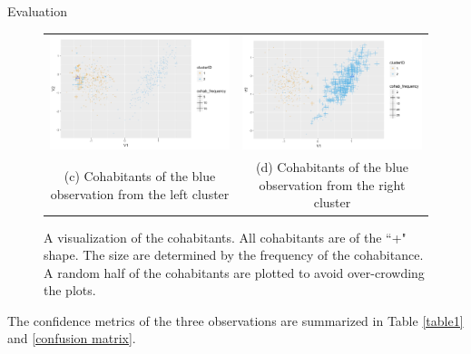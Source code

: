 \documentclass[12pt]{pom_thesis}
\begin{document}
\begin{chapter}{Evaluation}
\begin{figure}[h]
{\begin{tabular}{cc}
 \hspace{3mm}\includegraphics[width=1.1\textwidth,height = 0.8\textwidth]{example1_3.png} &   \includegraphics[width=1.1\textwidth,height = 0.8\textwidth]{example1_4.png} \\
(c) Cohabitants of the blue observation from the left cluster & (d) Cohabitants of the blue observation from the right cluster \\[6pt]
\end{tabular}}
\label{cohabitants-example-1}
\caption{A visualization of the cohabitants. All cohabitants are of the ``+" shape. The size are determined by the frequency of the cohabitance. A random half of the cohabitants are plotted to avoid over-crowding the plots.}
\end{figure}
\newpage
The confidence metrics of the three observations are summarized in Table \ref{table1} and \ref{confusion matrix}. 


\end{chapter}
\end{document}
